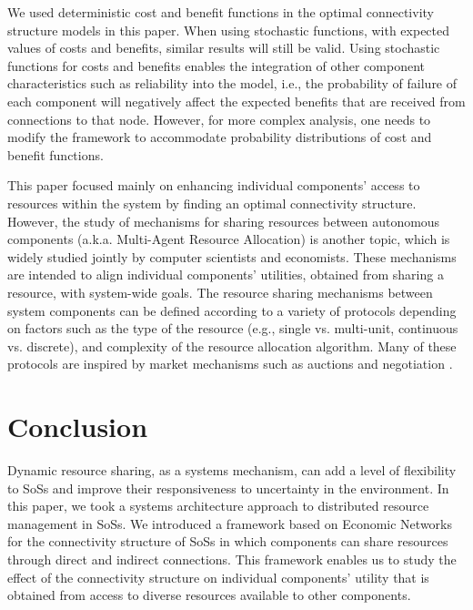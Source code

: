 \documentclass[journal,onecolumn]{IEEEtran}
\theoremstyle{plain}
\begin{document}
We used deterministic cost and benefit functions in the optimal connectivity structure models in this paper. When using stochastic functions, with expected values of costs and benefits, similar results will still be valid. Using stochastic functions for costs and benefits enables the integration of other component characteristics such as reliability into the model, i.e., the probability of failure of each component will negatively affect the expected benefits that are received from connections to that node. However, for more complex analysis, one needs to modify the framework to accommodate probability distributions of cost and benefit functions.




This paper focused mainly on enhancing individual components' access to resources within the system by finding an optimal connectivity structure. However, the study of mechanisms for sharing resources between autonomous components (a.k.a. Multi-Agent Resource Allocation) is another topic, which is widely studied jointly by computer scientists and economists. These mechanisms are intended to align individual components' utilities, obtained from sharing a resource, with system-wide goals. The resource sharing mechanisms between system components can be defined according to a variety of protocols depending on factors such as the type of the resource (e.g., single vs. multi-unit, continuous vs. discrete), and complexity of the resource allocation algorithm. Many of these protocols are inspired by market mechanisms such as auctions and negotiation \citep{chevaleyre2006issues}.

\section{Conclusion}
\label{conclusion}
Dynamic resource sharing, as a systems mechanism,  can add a level of flexibility to SoSs and improve their responsiveness to uncertainty in the environment. In this paper, we took a systems architecture approach to distributed resource management in SoSs. We introduced a framework based on Economic Networks for the connectivity structure of SoSs in which components can share resources through direct and indirect connections. This framework enables us to study the effect of the connectivity structure on individual components' utility that is obtained from access to diverse resources available to other components.
\end{document}
